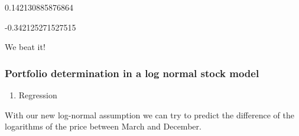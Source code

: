 \documentclass[11pt]{article}
\providecommand{\tightlist}{%
      \setlength{\itemsep}{0pt}\setlength{\parskip}{0pt}}
\begin{document}
    0.142130885876864


    -0.342125271527515


    We beat it!

    \hypertarget{portfolio-determination-in-a-log-normal-stock-model}{%
\subsubsection{Portfolio determination in a log normal stock
model}\label{portfolio-determination-in-a-log-normal-stock-model}}

    \begin{enumerate}
\def\labelenumi{\alph{enumi})}
\tightlist
\item
  Regression
\end{enumerate}

With our new log-normal assumption we can try to predict the difference
of the logarithms of the price between March and December.
\end{document}
